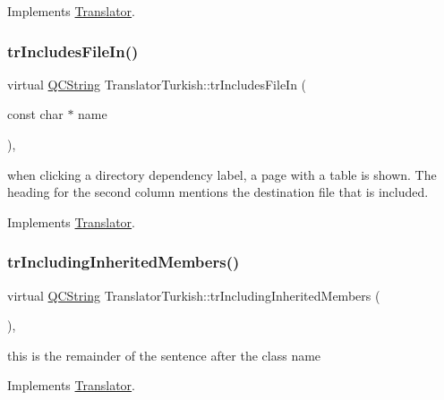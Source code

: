 Implements \mbox{\hyperlink{class_translator}{Translator}}.

\mbox{\label{class_translator_turkish_a863e8639af2855d5c9aed573d4ecfa79}} 
\subsubsection{\texorpdfstring{trIncludesFileIn()}{trIncludesFileIn()}}
{\footnotesize\ttfamily virtual \mbox{\hyperlink{class_q_c_string}{Q\+C\+String}} Translator\+Turkish\+::tr\+Includes\+File\+In (\begin{DoxyParamCaption}\item[{const char $\ast$}]{name }\end{DoxyParamCaption})\hspace{0.3cm}{\ttfamily [inline]}, {\ttfamily [virtual]}}

when clicking a directory dependency label, a page with a table is shown. The heading for the second column mentions the destination file that is included. 

Implements \mbox{\hyperlink{class_translator}{Translator}}.

\mbox{\label{class_translator_turkish_a5ab6bc3ede0ce8b7f9b4af82420a44d4}} 
\subsubsection{\texorpdfstring{trIncludingInheritedMembers()}{trIncludingInheritedMembers()}}
{\footnotesize\ttfamily virtual \mbox{\hyperlink{class_q_c_string}{Q\+C\+String}} Translator\+Turkish\+::tr\+Including\+Inherited\+Members (\begin{DoxyParamCaption}{ }\end{DoxyParamCaption})\hspace{0.3cm}{\ttfamily [inline]}, {\ttfamily [virtual]}}

this is the remainder of the sentence after the class name 

Implements \mbox{\hyperlink{class_translator}{Translator}}.

